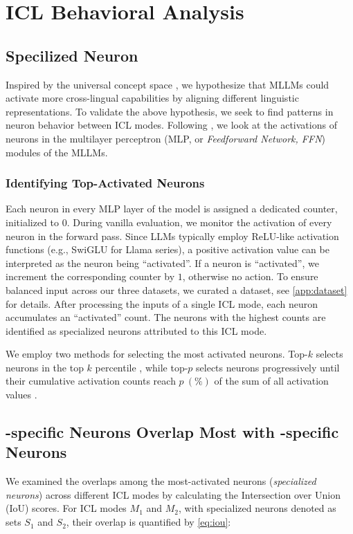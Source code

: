 \section{ICL Behavioral Analysis} \label{app:neuron}
\subsection{Specilized Neuron}
Inspired by the universal concept space \cite{llama_english_epfl, neuron_plnd, semantic_hub}, we hypothesize that MLLMs could activate more cross-lingual capabilities by aligning different linguistic representations. To validate the above hypothesis, we seek to find patterns in neuron behavior between ICL modes. Following \citet{neuron_specialization_translation,language_specific_neuron_msra,language_specific_neuron_tokyo,neuron_pim,neuron_plnd,neuron_sft}, we look at the activations of neurons in the multilayer perceptron (MLP, or \textit{Feedforward Network, FFN}) modules of the MLLMs.

\subsubsection{Identifying Top-Activated Neurons}
Each neuron in every MLP layer of the model is assigned a dedicated counter, initialized to $0$. During vanilla evaluation, we monitor the activation of every neuron in the forward pass. Since LLMs typically employ ReLU-like \cite{relu} activation functions (e.g., SwiGLU \cite{glu} for \textsf{Llama} series), a positive activation value can be interpreted as the neuron being ``activated''. If a neuron is ``activated'', we increment the corresponding counter by $1$, otherwise no action. To ensure balanced input across our three datasets, we curated a \combined dataset, see \cref{app:dataset} for details. After processing the inputs of a single ICL mode, each neuron accumulates an  ``activated'' count. The neurons with the highest counts are identified as specialized neurons attributed to this ICL mode.


We employ two methods for selecting the most activated neurons. Top-$k$ selects neurons in the top $k$ percentile \cite{language_specific_neuron_msra}, while top-$p$ selects neurons progressively until their cumulative activation counts reach $p\ (\%)$ of the sum of all activation values \cite{neuron_specialization_translation}. 



\subsection{\multilingual-specific Neurons Overlap Most with \native-specific Neurons}

We examined the overlaps among the most-activated neurons (\textit{specialized neurons}) across different ICL modes by calculating the Intersection over Union (IoU) scores. For ICL modes $M_1$ and $M_2$, with specialized neurons denoted as sets $S_1$ and $S_2$, their overlap is quantified by \cref{eq:iou}:

